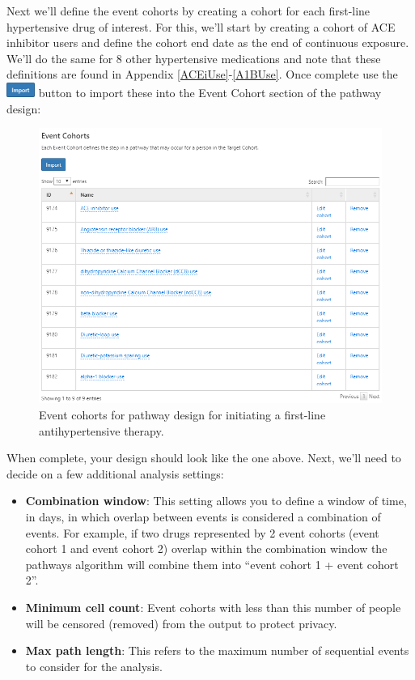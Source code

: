 \documentclass[11pt]{book}
\providecommand{\tightlist}{%
  \setlength{\itemsep}{0pt}\setlength{\parskip}{0pt}}
\theoremstyle{definition}
\theoremstyle{definition}
\theoremstyle{definition}
\theoremstyle{remark}
\begin{document}
Next we'll define the event cohorts by creating a cohort for each first-line hypertensive drug of interest. For this, we'll start by creating a cohort of ACE inhibitor users and define the cohort end date as the end of continuous exposure. We'll do the same for 8 other hypertensive medications and note that these definitions are found in Appendix \ref{ACEiUse}-\ref{A1BUse}. Once complete use the \includegraphics{images/Characterization/atlasImportButton.png} button to import these into the Event Cohort section of the pathway design:

\begin{figure}

{\centering \includegraphics[width=1\linewidth]{images/Characterization/atlasPathwaysEventCohorts} 

}

\caption{Event cohorts for pathway design for initiating a first-line antihypertensive therapy.}\label{fig:atlasPathwaysEventCohorts}
\end{figure}

When complete, your design should look like the one above. Next, we'll need to decide on a few additional analysis settings:

\begin{itemize}
\tightlist
\item
  \textbf{Combination window}: This setting allows you to define a window of time, in days, in which overlap between events is considered a combination of events. For example, if two drugs represented by 2 event cohorts (event cohort 1 and event cohort 2) overlap within the combination window the pathways algorithm will combine them into ``event cohort 1 + event cohort 2''.
\item
  \textbf{Minimum cell count}: Event cohorts with less than this number of people will be censored (removed) from the output to protect privacy.
\item
  \textbf{Max path length}: This refers to the maximum number of sequential events to consider for the analysis.
\end{itemize}
\end{document}
